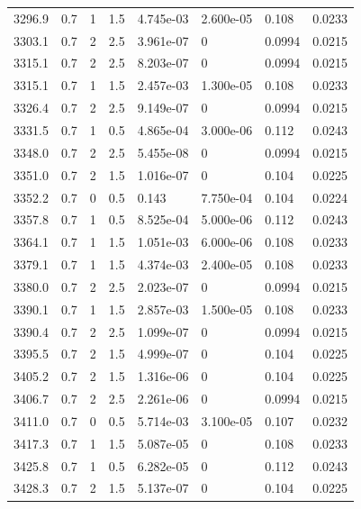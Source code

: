 \documentclass[preview]{standalone}
\begin{document}
{{{{{{{{{{{{\begin{tabular}{L{1.2cm}C{1.2cm} C{0.3cm}C{0.5cm} C{1.4cm}C{1.4cm} C{1.4cm}C{1.4cm}}
  3296.9  &   0.7  & 1     & 1.5 &  4.745e-03  & 2.600e-05  & 0.108 &  0.0233   \\ 
  3303.1  &   0.7  & 2     & 2.5 &  3.961e-07  & 0  & 0.0994 &  0.0215   \\ 
  3315.1  &   0.7  & 2     & 2.5 &  8.203e-07  & 0  & 0.0994 &  0.0215   \\ 
  3315.1  &   0.7  & 1     & 1.5 &  2.457e-03  & 1.300e-05  & 0.108 &  0.0233   \\ 
  3326.4  &   0.7  & 2     & 2.5 &  9.149e-07  & 0  & 0.0994 &  0.0215   \\ 
  3331.5  &   0.7  & 1     & 0.5 &  4.865e-04  & 3.000e-06  & 0.112 &  0.0243   \\ 
  3348.0  &   0.7  & 2     & 2.5 &  5.455e-08  & 0  & 0.0994 &  0.0215   \\ 
  3351.0  &   0.7  & 2     & 1.5 &  1.016e-07  & 0  & 0.104 &  0.0225   \\ 
  3352.2  &   0.7  & 0     & 0.5 &  0.143  & 7.750e-04  & 0.104 &  0.0224   \\ 
  3357.8  &   0.7  & 1     & 0.5 &  8.525e-04  & 5.000e-06  & 0.112 &  0.0243   \\ 
  3364.1  &   0.7  & 1     & 1.5 &  1.051e-03  & 6.000e-06  & 0.108 &  0.0233   \\ 
  3379.1  &   0.7  & 1     & 1.5 &  4.374e-03  & 2.400e-05  & 0.108 &  0.0233   \\ 
  3380.0  &   0.7  & 2     & 2.5 &  2.023e-07  & 0  & 0.0994 &  0.0215   \\ 
  3390.1  &   0.7  & 1     & 1.5 &  2.857e-03  & 1.500e-05  & 0.108 &  0.0233   \\ 
  3390.4  &   0.7  & 2     & 2.5 &  1.099e-07  & 0  & 0.0994 &  0.0215   \\ 
  3395.5  &   0.7  & 2     & 1.5 &  4.999e-07  & 0  & 0.104 &  0.0225   \\ 
  3405.2  &   0.7  & 2     & 1.5 &  1.316e-06  & 0  & 0.104 &  0.0225   \\ 
  3406.7  &   0.7  & 2     & 2.5 &  2.261e-06  & 0  & 0.0994 &  0.0215   \\ 
  3411.0  &   0.7  & 0     & 0.5 &  5.714e-03  & 3.100e-05  & 0.107 &  0.0232   \\ 
  3417.3  &   0.7  & 1     & 1.5 &  5.087e-05  & 0  & 0.108 &  0.0233   \\ 
  3425.8  &   0.7  & 1     & 0.5 &  6.282e-05  & 0  & 0.112 &  0.0243   \\ 
  3428.3  &   0.7  & 2     & 1.5 &  5.137e-07  & 0  & 0.104 &  0.0225   \\ 

\end{tabular}}}}}}}}}}}}}
\end{document}
